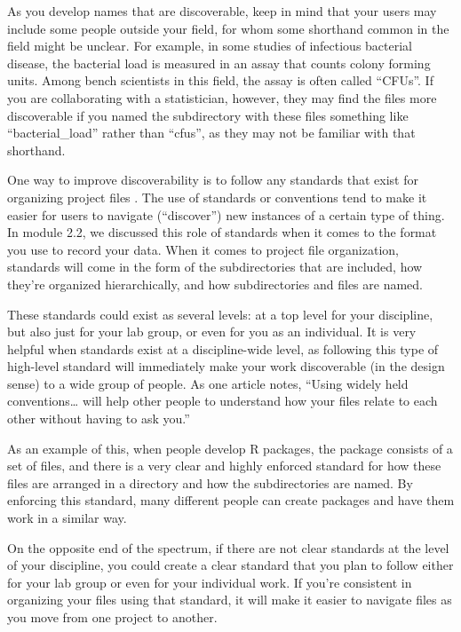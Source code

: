 \documentclass[]{tufte-book}
\begin{document}
As you develop names that are discoverable, keep in mind that your users may
include some people outside your field, for whom some shorthand common in the
field might be unclear. For example, in some studies of infectious bacterial
disease, the bacterial load is measured in an assay that counts colony forming
units. Among bench scientists in this field, the assay is often called ``CFUs''.
If you are collaborating with a statistician, however, they may find the
files more discoverable if you named the subdirectory with these files something
like ``bacterial\_load'' rather than ``cfus'', as they may not be familiar with that
shorthand.

One way to improve discoverability is to follow any standards that exist for
organizing project files \citep{marwick2018packaging}. The use of standards or
conventions tend to make it easier for users to navigate (``discover'') new
instances of a certain type of thing. In module 2.2, we discussed this role of
standards when it comes to the format you use to record your data. When it comes
to project file organization, standards will come in the form of the
subdirectories that are included, how they're organized hierarchically, and how
subdirectories and files are named.

These standards could exist as several levels: at a top level for your
discipline, but also just for your lab group, or even for you as an individual.
It is very helpful when standards exist at a discipline-wide level, as following
this type of high-level standard will immediately make your work discoverable
(in the design sense) to a wide group of people. As one article notes,
``Using widely held conventions\ldots{} will help other people to understand how your
files relate to each other without having to ask you.'' \citep{marwick2018packaging}

As an example of this, when people develop R packages, the package consists of a
set of files, and there is a very clear and highly enforced standard for how
these files are arranged in a directory and how the subdirectories are named. By
enforcing this standard, many different people can create packages and have them
work in a similar way.

On the opposite end of the spectrum, if there are not clear
standards at the level of your discipline, you could create a clear standard
that you plan to follow either for your lab group or even for your individual
work. If you're consistent in organizing your files using that standard, it will
make it easier to navigate files as you move from one project to another.
\end{document}
